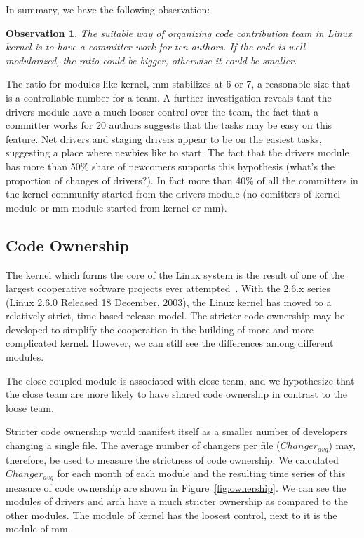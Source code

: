 \documentclass{sig-alternate-05-2015}
\newtheorem{observation}{\bf Observation}
\begin{document}
In summary, we have the following observation:
\begin{observation}\label{o:1}
 The suitable way of organizing code contribution team in Linux kernel is
to have a committer work for ten authors. If the code is well modularized, 
the ratio could be bigger, otherwise it could be smaller.
\end{observation}

The ratio for modules like kernel, mm stabilizes at 6 or 7, a reasonable %
size that is a controllable number for a team.
A further investigation reveals that the drivers module have a much looser control over
the team, the fact that a committer works for 20 authors suggests that the tasks 
may be easy on this feature. Net drivers and staging drivers appear to be on
the easiest tasks, suggesting a place where newbies like to start. The fact
that the drivers module has more than 50\% share of newcomers supports this
hypothesis (what's the proportion of changes of drivers?).
In fact more than 40\% of all the committers in the kernel community
started from the drivers module (no comitters of kernel module or mm module started from kernel or mm).

\subsection{Code Ownership}
 The kernel which forms the core of the Linux system is the result 
of one of the largest cooperative software
projects ever attempted~\cite{kerneldvp}.
With the 2.6.x series (Linux 2.6.0 Released 18 December, 2003), the Linux kernel has moved to a relatively 
strict,  time-based  release  model. 
The stricter code ownership may be developed to simplify the cooperation
in the building of more and more complicated kernel.
However, we can still see the differences among different modules.

The close coupled module is associated with close team, and we hypothesize 
that the close team are more likely to have shared code ownership in contrast
to the loose team.

Stricter code ownership would manifest itself as a smaller number of
developers changing a single file. The average number of changers
per file ($Changer_{avg}$) may, therefore, be used to measure the
strictness of code ownership. We calculated $Changer_{avg}$ for each
month of each module and the resulting time series of this measure of code
ownership are shown in Figure~\ref{fig:ownership}. 
We can see the modules of drivers and arch have a much stricter
ownership as compared to the other modules.
The module of kernel has the loosest control, next to it is the module of mm. 
\end{document}
